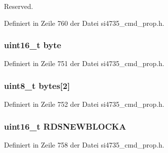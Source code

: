 Reserved. 



Definiert in Zeile 760 der Datei si4735\+\_\+cmd\+\_\+prop.\+h.

\hypertarget{unionfm__rds__int__source_ab0549c1b5ea980a02e7eab77e21fea49}{}
\subsubsection[{byte}]{\setlength{\rightskip}{0pt plus 5cm}uint16\+\_\+t byte}\label{unionfm__rds__int__source_ab0549c1b5ea980a02e7eab77e21fea49}


Definiert in Zeile 751 der Datei si4735\+\_\+cmd\+\_\+prop.\+h.

\hypertarget{unionfm__rds__int__source_a46e4c05d20a047ec169f60d3167e912e}{}
\subsubsection[{bytes}]{\setlength{\rightskip}{0pt plus 5cm}uint8\+\_\+t bytes\mbox{[}2\mbox{]}}\label{unionfm__rds__int__source_a46e4c05d20a047ec169f60d3167e912e}


Definiert in Zeile 752 der Datei si4735\+\_\+cmd\+\_\+prop.\+h.

\hypertarget{unionfm__rds__int__source_ac17dff4f668dfb0ff56bc115adf2190a}{}
\subsubsection[{R\+D\+S\+N\+E\+W\+B\+L\+O\+C\+K\+A}]{\setlength{\rightskip}{0pt plus 5cm}uint16\+\_\+t R\+D\+S\+N\+E\+W\+B\+L\+O\+C\+K\+A}\label{unionfm__rds__int__source_ac17dff4f668dfb0ff56bc115adf2190a}


Definiert in Zeile 758 der Datei si4735\+\_\+cmd\+\_\+prop.\+h.

\hypertarget{unionfm__rds__int__source_ae17ab7ac1a00946b1d73b05899a30202}{}
